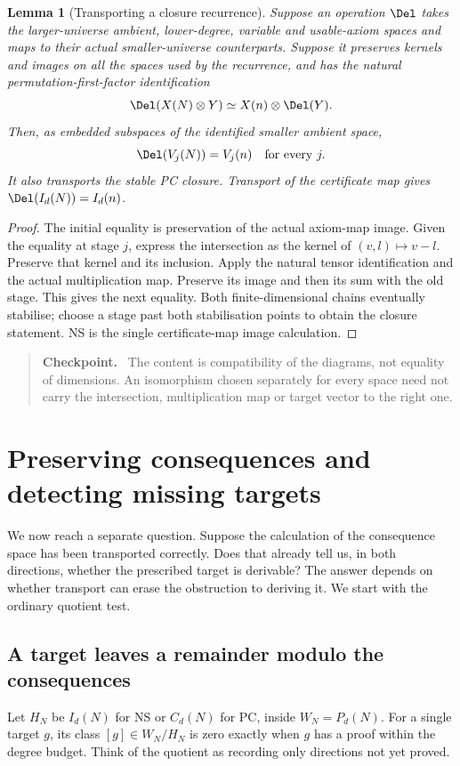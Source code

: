 \documentclass[11pt,a4paper,oneside,openany]{book}
\newtheorem{lemma}[theorem]{Lemma}
\theoremstyle{definition}\newtheorem{definition}[theorem]{Definition}
\theoremstyle{remark}\newtheorem{remark}[theorem]{Remark}
\newenvironment{checkpoint}{\begin{quote}\small\textbf{Checkpoint.}\ }{\end{quote}}
\numberwithin{equation}{chapter}
\begin{document}
\begin{lemma}[Transporting a closure recurrence]\label{tx:lem:closure-transport}
Suppose an operation $\Del$ takes the larger-universe ambient, lower-degree,
variable and usable-axiom spaces and maps to their actual smaller-universe
counterparts. Suppose it preserves kernels and images on all the spaces
used by the recurrence, and has the natural permutation-first-factor
identification
\[
 \Del(X(N)\otimes Y)\simeq X(n)\otimes\Del(Y).
\]
Then, as embedded subspaces of the identified smaller ambient space,
\[
                         \Del(V_j(N))=V_j(n)
                         \quad\text{for every }j.
\]
It also transports the stable PC closure. Transport of the certificate
map gives $\Del(I_d(N))=I_d(n)$.
\end{lemma}
\begin{proof}
The initial equality is preservation of the actual axiom-map image.
Given the equality at stage $j$, express the intersection as the kernel
of $(v,l)\mapsto v-l$. Preserve that kernel and its inclusion. Apply
the natural tensor identification and the actual multiplication map.
Preserve its image and then its sum with the old stage. This gives the
next equality. Both finite-dimensional chains eventually stabilise;
choose a stage past both stabilisation points to obtain the closure
statement. NS is the single certificate-map image calculation.
\end{proof}

\begin{checkpoint}
The content is compatibility of the diagrams, not equality of dimensions.
An isomorphism chosen separately for every space need not carry the
intersection, multiplication map or target vector to the right one.
\end{checkpoint}

\section{Preserving consequences and detecting missing targets}\label{tx:sec:target-reflection}
We now reach a separate question. Suppose the calculation of the
consequence space has been transported correctly. Does that already
tell us, in both directions, whether the prescribed target is derivable?
The answer depends on whether transport can erase the obstruction
to deriving it. We start with the ordinary quotient test.

\subsection{A target leaves a remainder modulo the consequences}
Let $H_N$ be $I_d(N)$ for NS or $C_d(N)$ for PC, inside
$W_N=P_d(N)$. For a single target $g$, its class $[g]\in W_N/H_N$
is zero exactly when $g$ has a proof within the degree budget.
Think of the quotient as recording only directions not yet proved.
\end{document}
